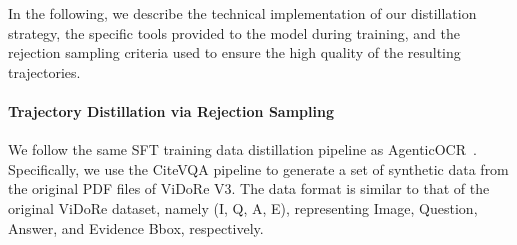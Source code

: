 \documentclass[]{opendatalab}
\begin{document}
{{{\begin{table}[htbp]
\centering
\footnotesize
{}
\caption{Performance comparison on FinRAGBench-V~\citep{zhao-etal-2025-finragbench} (subset with bounding boxes) and the held-out test set of ViDoRe V3.
$\mathbf{Page_{acc}}$ measures page-level judgment ability; $\mathbf{Recall_{min}}$ indicates coarse-grained localization;
$\mathbf{Recall_{EM}}$ reflects exact-grained localization. On FinRAGBench-V, CiteVQA Pipeline (3k) achieves comparable or
slightly better performance than Vidore Original (5k). On ViDoRe V3, Vidore Original shows a slight advantage.
}
\label{tab:retrieval_results}
\end{table}

In the following, we describe the technical implementation of our distillation strategy, the specific tools provided to the model during training, and the rejection sampling criteria used to ensure the high quality of the resulting trajectories.

\paragraph{Trajectory Distillation via Rejection Sampling} We follow the same SFT training data distillation pipeline as AgenticOCR~\citep{wang2026agenticocr}. Specifically, we use the CiteVQA pipeline to generate a set of synthetic data from the original PDF files of ViDoRe V3. The data format is similar to that of the original ViDoRe dataset, namely (I, Q, A, E), representing Image, Question, Answer, and Evidence Bbox, respectively.

}}}
\end{document}
